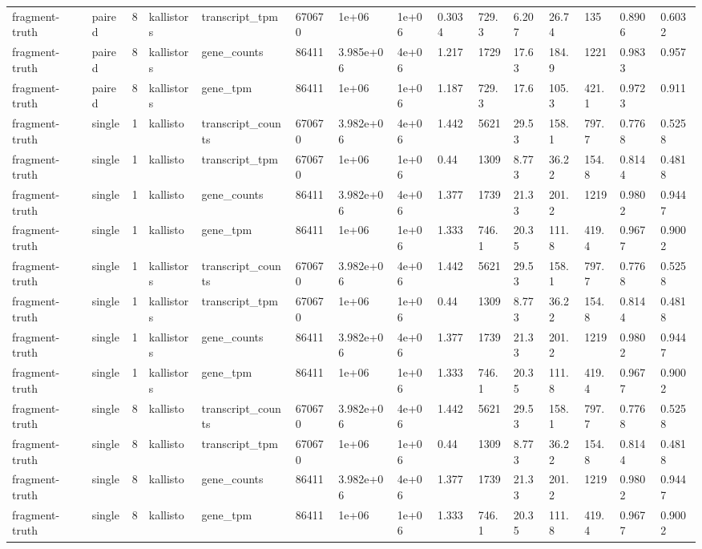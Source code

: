 \begin{tabular}{lllllllllllllll}
fragment-truth & paired & 8 & kallistors & transcript\_tpm & 670670 & 1e+06 & 1e+06 & 0.3034 & 729.3 & 6.207 & 26.74 & 135 & 0.8906 & 0.6032 \\
fragment-truth & paired & 8 & kallistors & gene\_counts & 86411 & 3.985e+06 & 4e+06 & 1.217 & 1729 & 17.63 & 184.9 & 1221 & 0.9833 & 0.957 \\
fragment-truth & paired & 8 & kallistors & gene\_tpm & 86411 & 1e+06 & 1e+06 & 1.187 & 729.3 & 17.6 & 105.3 & 421.1 & 0.9723 & 0.911 \\
fragment-truth & single & 1 & kallisto & transcript\_counts & 670670 & 3.982e+06 & 4e+06 & 1.442 & 5621 & 29.53 & 158.1 & 797.7 & 0.7768 & 0.5258 \\
fragment-truth & single & 1 & kallisto & transcript\_tpm & 670670 & 1e+06 & 1e+06 & 0.44 & 1309 & 8.773 & 36.22 & 154.8 & 0.8144 & 0.4818 \\
fragment-truth & single & 1 & kallisto & gene\_counts & 86411 & 3.982e+06 & 4e+06 & 1.377 & 1739 & 21.33 & 201.2 & 1219 & 0.9802 & 0.9447 \\
fragment-truth & single & 1 & kallisto & gene\_tpm & 86411 & 1e+06 & 1e+06 & 1.333 & 746.1 & 20.35 & 111.8 & 419.4 & 0.9677 & 0.9002 \\
fragment-truth & single & 1 & kallistors & transcript\_counts & 670670 & 3.982e+06 & 4e+06 & 1.442 & 5621 & 29.53 & 158.1 & 797.7 & 0.7768 & 0.5258 \\
fragment-truth & single & 1 & kallistors & transcript\_tpm & 670670 & 1e+06 & 1e+06 & 0.44 & 1309 & 8.773 & 36.22 & 154.8 & 0.8144 & 0.4818 \\
fragment-truth & single & 1 & kallistors & gene\_counts & 86411 & 3.982e+06 & 4e+06 & 1.377 & 1739 & 21.33 & 201.2 & 1219 & 0.9802 & 0.9447 \\
fragment-truth & single & 1 & kallistors & gene\_tpm & 86411 & 1e+06 & 1e+06 & 1.333 & 746.1 & 20.35 & 111.8 & 419.4 & 0.9677 & 0.9002 \\
fragment-truth & single & 8 & kallisto & transcript\_counts & 670670 & 3.982e+06 & 4e+06 & 1.442 & 5621 & 29.53 & 158.1 & 797.7 & 0.7768 & 0.5258 \\
fragment-truth & single & 8 & kallisto & transcript\_tpm & 670670 & 1e+06 & 1e+06 & 0.44 & 1309 & 8.773 & 36.22 & 154.8 & 0.8144 & 0.4818 \\
fragment-truth & single & 8 & kallisto & gene\_counts & 86411 & 3.982e+06 & 4e+06 & 1.377 & 1739 & 21.33 & 201.2 & 1219 & 0.9802 & 0.9447 \\
fragment-truth & single & 8 & kallisto & gene\_tpm & 86411 & 1e+06 & 1e+06 & 1.333 & 746.1 & 20.35 & 111.8 & 419.4 & 0.9677 & 0.9002 \\

\end{tabular}
